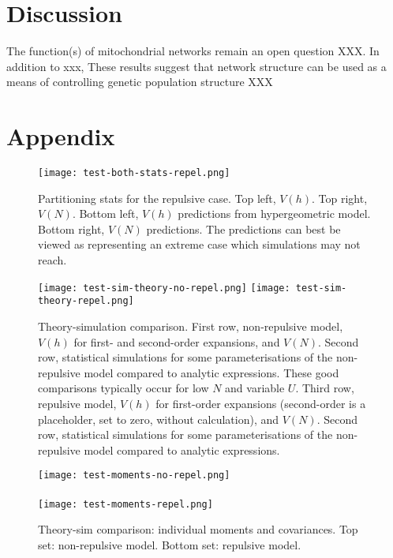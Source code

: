 \documentclass{article}
\begin{document}
\section*{Discussion} 
The function(s) of mitochondrial networks remain an open question XXX. In addition to xxx, These results suggest that network structure can be used as a means of controlling genetic population structure XXX

\newpage
\clearpage

\section*{Appendix}

\begin{figure}
  \texttt{[image: test-both-stats-repel.png]}
  \caption{Partitioning stats for the repulsive case. Top left, $V(h)$. Top right, $V(N)$. Bottom left, $V(h)$ predictions from hypergeometric model. Bottom right, $V(N)$ predictions. The predictions can best be viewed as representing an extreme case which simulations may not reach.}
  \label{fig1a}
\end{figure}

\begin{figure}
  \texttt{[image: test-sim-theory-no-repel.png]}
  \texttt{[image: test-sim-theory-repel.png]}
  \caption{Theory-simulation comparison. First row, non-repulsive model, $V(h)$ for first- and second-order expansions, and $V(N)$. Second row, statistical simulations for some parameterisations of the non-repulsive model compared to analytic expressions. These good comparisons typically occur for low $N$ and variable $U$. Third row, repulsive model, $V(h)$ for first-order expansions (second-order is a placeholder, set to zero, without calculation), and $V(N)$. Second row, statistical simulations for some parameterisations of the non-repulsive model compared to analytic expressions. }
  \label{fig2}
\end{figure}

\begin{figure}
  \texttt{[image: test-moments-no-repel.png]} \\ \\
  \texttt{[image: test-moments-repel.png]}
  \caption{Theory-sim comparison: individual moments and covariances. Top set: non-repulsive model. Bottom set: repulsive model.}
  \label{fig2}
\end{figure}
\end{document}
